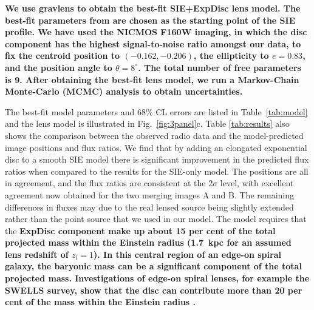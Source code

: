 \documentclass[a4paper,fleqn,usenatbib,useAMS]{mnras}
\begin{document}
\textbf{We use {\sc gravlens} to obtain the best-fit SIE+ExpDisc lens model. The best-fit parameters from \citet{Marlow99} are chosen as the starting point of the SIE profile. We have used the NICMOS F160W imaging, in which the disc component has the highest signal-to-noise ratio amongst our data, to fix the centroid position to $(-0.162, -0.206)$, the ellipticity to $e=0.83$, and the position angle to $\theta=8^\circ$. The total number of free parameters is 9. After obtaining the best-fit lens model, we run a Markov-Chain Monte-Carlo (MCMC) analysis to obtain uncertainties.}

The best-fit model parameters and 68\% CL errors are listed in Table~\ref{tab:model} and the lens model is illustrated in Fig.~\ref{fig:3panel}c. Table \ref{tab:results} also shows the comparison between the observed radio data and the model-predicted image positions and flux ratios. We find that by adding an elongated exponential disc to a smooth SIE model there is significant improvement in the predicted flux ratios when compared to the results for the SIE-only model. 
The positions are all in agreement, and the flux ratios are consistent at the $2\sigma$ level, with excellent agreement now obtained for the two merging images A and B. The remaining differences in fluxes may due to the real lensed source being slightly extended rather than the point source that we used in our model. The model requires that the \textbf{ExpDisc component make up about 15 per cent of the total projected mass within the Einstein radius (1.7~kpc for an assumed lens redshift of $z_l = 1$).  In this central region of an edge-on spiral galaxy, the baryonic mass can be a significant component of the total projected mass. Investigations of edge-on spiral lenses, for example the SWELLS survey, show that the disc can contribute more than 20 per cent of the mass within the Einstein radius \citep{swells1,swells3,swells6}.} 
\end{document}
